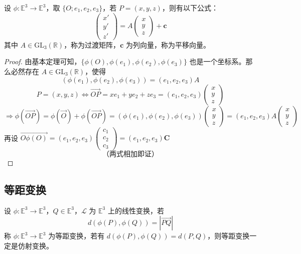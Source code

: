 \documentclass[lang=cn,10pt,thmcnt=section]{elegantbook}
\begin{document}
    \begin{theorem}[仿射变换的坐标]\label{thm:affine_coordinates}
        设 $\phi: \mathbb{E}^3 \rightarrow \mathbb{E}^3$，取 $\{O; e_1, e_2, e_3\}$，若 $P = (x, y, z)$，则有以下公式：
        \[
        \begin{pmatrix}
        x' \\
        y' \\
        z'
        \end{pmatrix}
        =
        A
        \begin{pmatrix}
        x \\
        y \\
        z
        \end{pmatrix}
        + \mathbf{c}
        \]
        其中 $A \in \text{GL}_3(\mathbb{R})$，称为过渡矩阵，$\mathbf{c}$ 为列向量，称为平移向量。
        \end{theorem}
        
        \begin{proof}
        由基本定理可知，$\{\phi(O), \phi(e_1), \phi(e_2), \phi(e_3)\}$ 也是一个坐标系。那么必然存在 $A \in \text{GL}_3(\mathbb{R})$，使得
        \[
        (\phi(e_1), \phi(e_2), \phi(e_3)) = (e_1, e_2, e_3) A
        \]
        \[
        P = (x, y, z) \Leftrightarrow \overrightarrow{OP} = x e_1 + y e_2 + z e_3 = (e_1, e_2, e_3) \begin{pmatrix} x \\ y \\ z \end{pmatrix}
        \]
        \[
        \Rightarrow \phi(\overrightarrow{OP}) = \phi(\overrightarrow{O}) + \phi(\overrightarrow{OP}) = (\phi(e_1), \phi(e_2), \phi(e_3)) \begin{pmatrix} x \\ y \\ z \end{pmatrix} = (e_1, e_2, e_3) A \begin{pmatrix} x \\ y \\ z \end{pmatrix}
        \]
        再设 $\overrightarrow{O\phi(O)} = (e_1, e_2, e_3) \begin{pmatrix} c_1 \\ c_2 \\ c_3 \end{pmatrix} = (e_1, e_2, e_3) \mathbf{C}$
        \[
        \text{（两式相加即证）}
        \]
        \end{proof}
    \subsection{等距变换}
    \begin{definition}[等距变换]
        设 $\phi: \mathbb{E}^3 \to \mathbb{E}^3$，$Q \in \mathbb{E}^3$，$\mathcal{L}$ 为 $\mathbb{E}^3$ 上的线性变换，若
        \[
        d(\phi(P), \phi(Q)) = |\overrightarrow{PQ}|
        \]
        称 $\phi: \mathbb{E}^3 \to \mathbb{E}^3$ 为等距变换，若有 $d(\phi(P), \phi(Q)) = d(P, Q)$，则等距变换一定是仿射变换。
        \end{definition}
        
\end{document}
